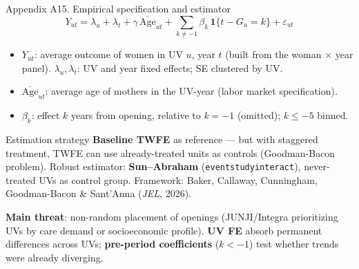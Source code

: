 \documentclass[aspectratio=169,10pt]{beamer}
\newcommand{\takeaway}[1]{\par\vspace{6pt}{\small\textcolor{steel}{$\Rightarrow$}\ \textbf{\textcolor{navy}{#1}}}}
\begin{document}
\begin{frame}{Appendix A15. Empirical specification and estimator}
\[
Y_{ut} = \lambda_u + \lambda_t + \gamma\,\overline{\text{Age}}_{ut} + \sum_{k \neq -1} \beta_k \, \mathbf{1}\{t - G_u = k\} + \varepsilon_{ut}
\]

\vspace{2pt}
\begin{itemize}
  \footnotesize
  \item $Y_{ut}$: average outcome of women in UV $u$, year $t$ (built from the woman $\times$ year panel). $\lambda_u,\lambda_t$: UV and year fixed effects; SE clustered by UV.
  \item $\overline{\text{Age}}_{ut}$: average age of mothers in the UV-year (labor market specification).
  \item $\beta_k$: effect $k$ years from opening, relative to $k=-1$ (omitted); $k \le -5$ binned.
\end{itemize}

\vspace{4pt}
\begin{block}{Estimation strategy}
\footnotesize \textbf{Baseline TWFE} as reference --- but with staggered treatment, TWFE can use already-treated units as controls (Goodman-Bacon problem). Robust estimator: \textbf{Sun--Abraham} (\texttt{eventstudyinteract}), never-treated UVs as control group. Framework: Baker, Callaway, Cunningham, Goodman-Bacon \& Sant'Anna (\emph{JEL}, 2026).
\end{block}

\vspace{4pt}
\footnotesize \textbf{Main threat}: non-random placement of openings (JUNJI/Integra prioritizing UVs by care demand or socioeconomic profile). \textbf{UV FE} absorb permanent differences across UVs; \textbf{pre-period coefficients} ($k<-1$) test whether trends were already diverging.

\takeaway{Main estimator: Sun--Abraham with never-treated UVs as controls; TWFE as reference.}
\end{frame}
\end{document}

